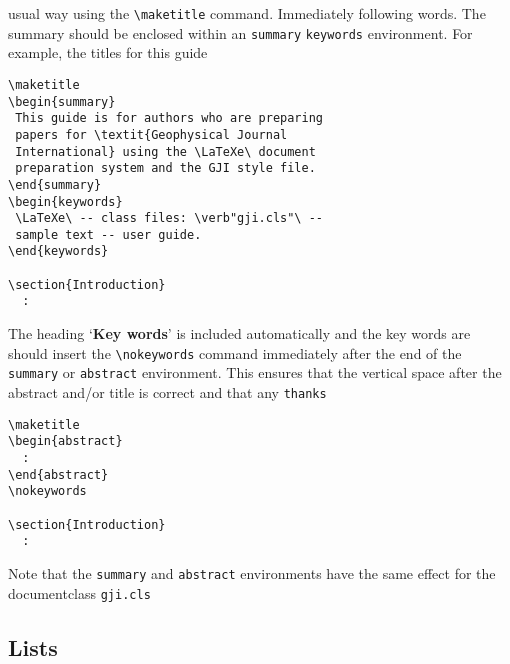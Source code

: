 usual way using the \verb"\maketitle" command. Immediately following
words. The summary should be enclosed within an \verb"summary"
\verb"keywords" environment. For example, the titles for this guide
\begin{verbatim}
\maketitle
\begin{summary}
 This guide is for authors who are preparing
 papers for \textit{Geophysical Journal
 International} using the \LaTeXe\ document
 preparation system and the GJI style file.
\end{summary}
\begin{keywords}
 \LaTeXe\ -- class files: \verb"gji.cls"\ --
 sample text -- user guide.
\end{keywords}

\section{Introduction}
  :
\end{verbatim}
The heading `\textbf{Key words}' is included automatically and the key words are
should insert the \verb"\nokeywords" command immediately after the end of the
\verb"summary" or \verb"abstract" environment. This ensures that the vertical
space after the abstract and/or title is correct and that any \verb"thanks"
\begin{verbatim}
\maketitle
\begin{abstract}
  :
\end{abstract}
\nokeywords

\section{Introduction}
  :
\end{verbatim}

Note that the \verb"summary" and \verb"abstract" environments have the same
effect for the documentclass \verb"gji.cls"

\subsection{Lists}

